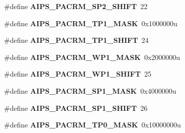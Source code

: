\begin{DoxyCompactItemize}
\item 
\#define {\bfseries A\+I\+P\+S\+\_\+\+P\+A\+C\+R\+M\+\_\+\+S\+P2\+\_\+\+S\+H\+I\+FT}~22\hypertarget{group__AIPS__Register__Masks_gabc851a97b4b79dcaea4dd6bb31eb4241}{}\label{group__AIPS__Register__Masks_gabc851a97b4b79dcaea4dd6bb31eb4241}

\item 
\#define {\bfseries A\+I\+P\+S\+\_\+\+P\+A\+C\+R\+M\+\_\+\+T\+P1\+\_\+\+M\+A\+SK}~0x1000000u\hypertarget{group__AIPS__Register__Masks_ga569fcf266897909dfb3772a44caed513}{}\label{group__AIPS__Register__Masks_ga569fcf266897909dfb3772a44caed513}

\item 
\#define {\bfseries A\+I\+P\+S\+\_\+\+P\+A\+C\+R\+M\+\_\+\+T\+P1\+\_\+\+S\+H\+I\+FT}~24\hypertarget{group__AIPS__Register__Masks_gafd96ab7fddfae6d60efd93e20fc5512c}{}\label{group__AIPS__Register__Masks_gafd96ab7fddfae6d60efd93e20fc5512c}

\item 
\#define {\bfseries A\+I\+P\+S\+\_\+\+P\+A\+C\+R\+M\+\_\+\+W\+P1\+\_\+\+M\+A\+SK}~0x2000000u\hypertarget{group__AIPS__Register__Masks_ga9f25421d89e73f7449650d855a71f812}{}\label{group__AIPS__Register__Masks_ga9f25421d89e73f7449650d855a71f812}

\item 
\#define {\bfseries A\+I\+P\+S\+\_\+\+P\+A\+C\+R\+M\+\_\+\+W\+P1\+\_\+\+S\+H\+I\+FT}~25\hypertarget{group__AIPS__Register__Masks_gad5745b23dd48b7ff19410ee5a1e7d6b7}{}\label{group__AIPS__Register__Masks_gad5745b23dd48b7ff19410ee5a1e7d6b7}

\item 
\#define {\bfseries A\+I\+P\+S\+\_\+\+P\+A\+C\+R\+M\+\_\+\+S\+P1\+\_\+\+M\+A\+SK}~0x4000000u\hypertarget{group__AIPS__Register__Masks_ga31b6d5109d958dbc8d34e46e5ab49db2}{}\label{group__AIPS__Register__Masks_ga31b6d5109d958dbc8d34e46e5ab49db2}

\item 
\#define {\bfseries A\+I\+P\+S\+\_\+\+P\+A\+C\+R\+M\+\_\+\+S\+P1\+\_\+\+S\+H\+I\+FT}~26\hypertarget{group__AIPS__Register__Masks_ga8d72f95920b7643efb797ce7c78bd110}{}\label{group__AIPS__Register__Masks_ga8d72f95920b7643efb797ce7c78bd110}

\item 
\#define {\bfseries A\+I\+P\+S\+\_\+\+P\+A\+C\+R\+M\+\_\+\+T\+P0\+\_\+\+M\+A\+SK}~0x10000000u\hypertarget{group__AIPS__Register__Masks_gaa7d99491b3e824cf86d22211d28ec36a}{}\label{group__AIPS__Register__Masks_gaa7d99491b3e824cf86d22211d28ec36a}


\end{DoxyCompactItemize}

